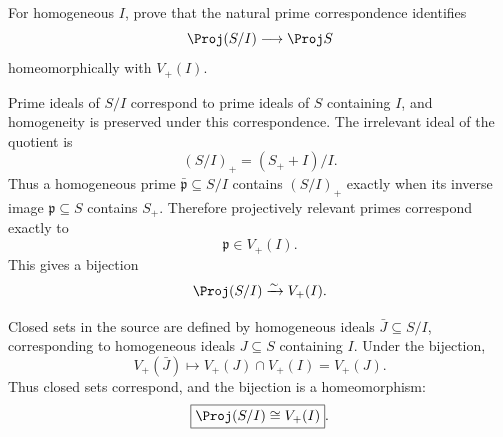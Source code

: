 \begin{problem}\label{prob:vi35-09}
For homogeneous \(I\), prove that the natural prime correspondence identifies
\[
\Proj(S/I)\longrightarrow \Proj S
\]
homeomorphically with \(V_+(I)\).
\end{problem}

\ifdefined\FullProblemDossiers
\begin{solution}
Prime ideals of \(S/I\) correspond to prime ideals of \(S\) containing \(I\), and homogeneity is preserved under
this correspondence. The irrelevant ideal of the quotient is
\[
(S/I)_+=(S_++I)/I.
\]
Thus a homogeneous prime \(\bar{\mathfrak p}\subseteq S/I\) contains \((S/I)_+\) exactly when its inverse image
\(\mathfrak p\subseteq S\) contains \(S_+\). Therefore projectively relevant primes correspond exactly to
\[
\mathfrak p\in V_+(I).
\]
This gives a bijection
\[
\Proj(S/I)\xrightarrow{\sim}V_+(I).
\]

Closed sets in the source are defined by homogeneous ideals \(\bar J\subseteq S/I\), corresponding to homogeneous
ideals \(J\subseteq S\) containing \(I\). Under the bijection,
\[
V_+(\bar J)
\longmapsto
V_+(J)\cap V_+(I)=V_+(J).
\]
Thus closed sets correspond, and the bijection is a homeomorphism:
\[
\boxed{\Proj(S/I)\cong V_+(I)}.
\]
\end{solution}
\fi
